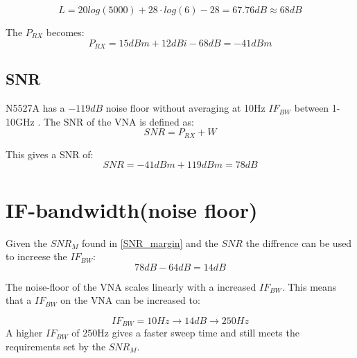 \begin{equation}
L = 20log (5000) + 28 \cdot log(6)-28 = 67.76dB \approx 68dB
\label{eq:path_loss}
\end{equation}

The $P_{RX}$ becomes:
\begin{equation}
P_{RX} = 15dBm + 12dBi - 68dB = -41dBm
\label{NFvna}
\end{equation}
\subsection{SNR}
 N5527A has a $-119dB$ noise floor without averaging at 10Hz $IF_{BW}$ between 1-10GHz \citep{Key_PNA}. The \gls{SNR} of the VNA  is defined as:
\begin{equation}
SNR = P_{RX}+W
\end{equation}

\begin{where}
\end{where}

This gives a SNR of:
\begin{equation}
SNR = -41dBm+119dBm = 78dB
\end{equation}


\section{IF-bandwidth(noise floor)}
Given the $SNR_{M}$ found in \autoref{SNR_margin} and the $SNR$ the diffrence can be used to increese the $IF_{BW}$:
\begin{equation}
  78dB-64dB = 14dB 
\end{equation}

The noise-floor of the \gls{VNA} scales linearly with a increased $IF_{BW}$\citep{PNA_scale}. This means that a $IF_{BW}$ on the \gls{VNA} can be increased to:

\begin{equation}
IF_{BW} = 10Hz \rightarrow 14dB \rightarrow 250Hz
\end{equation}
A higher $IF_{BW}$ of 250Hz  gives a faster sweep time and still meets the requirements set by the $SNR_M$.
